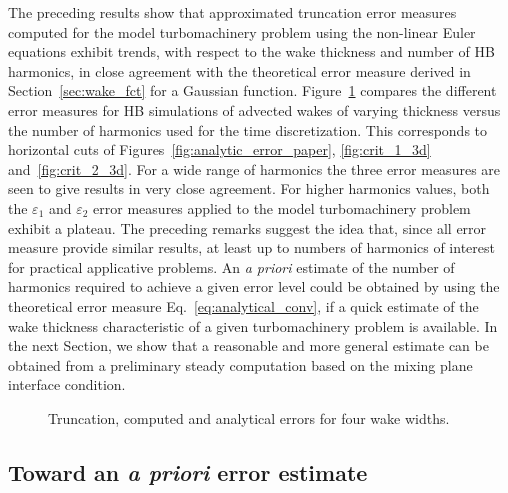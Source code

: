 The preceding results show that approximated truncation error 
measures computed for the model turbomachinery problem 
using the non-linear Euler equations
exhibit trends, with respect to the wake thickness 
and number of HB harmonics, in close agreement with the 
theoretical error measure derived in Section~\ref{sec:wake_fct}
for a Gaussian function. 
Figure~\ref{fig:error_comp_curves} compares the 
different error measures for HB simulations of 
advected wakes of varying thickness versus 
the number of harmonics used for the time discretization. 
This corresponds to horizontal cuts of Figures~\ref{fig:analytic_error_paper}, 
\ref{fig:crit_1_3d} and~\ref{fig:crit_2_3d}. 
For a wide range of harmonics 
the three error measures are seen to give 
results in very close agreement. For higher harmonics values, 
both the $\varepsilon_1$ and $\varepsilon_2$ error 
measures applied to the model turbomachinery problem 
exhibit a plateau. 
The preceding remarks suggest the idea that, 
since all error measure provide similar results, 
at least up to numbers of harmonics of interest for 
practical applicative problems. An \emph{a priori} 
estimate of the number of harmonics required 
to achieve a given error level could  be 
obtained by using the theoretical error measure 
Eq.~\eqref{eq:analytical_conv}, if a quick 
estimate of the wake thickness characteristic 
of a given turbomachinery problem is available. 
In the next Section, we show that a reasonable and more general 
estimate  
can be obtained from a preliminary steady 
computation based on the mixing plane interface condition.
\begin{figure}[htp]
  \centering
  \quad
  \quad
  \quad
  \quad
  \caption{Truncation, computed and analytical errors for four wake widths.}
  \label{fig:error_comp_curves}
\end{figure}

\subsection{Toward an \emph{a priori} error estimate}
\label{sub:prediction_tool_azimuthal_fft}


